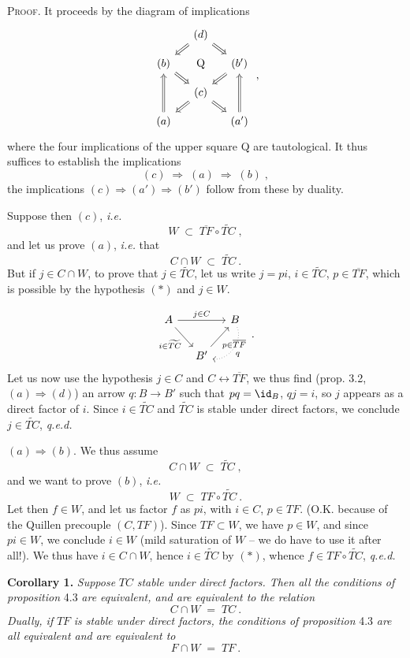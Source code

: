 \textsc{Proof}. It proceeds by the diagram of implications
\[
\begin{tikzcd}[column sep=small, row sep=small]
& (d) \arrow[dl, Rightarrow] \arrow[dr, Rightarrow] & \\
(b) \arrow[dr, Rightarrow] & \mathrm{Q} & (b') \arrow[dl, Rightarrow] \\
& (c) \arrow[dl, Rightarrow] \arrow[dr, Rightarrow] & \\
(a) \arrow[uu, Rightarrow] & & (a') \arrow[uu, Rightarrow]
\end{tikzcd}
\;,
\]
where the four implications of the upper square Q are tautological. It thus suffices to establish the implications
\[
(c) \;\Longrightarrow\; (a) \;\Longrightarrow\; (b)\;,
\]
the implications $(c)\Longrightarrow(a')\Longrightarrow(b')$ follow from these by duality.

Suppose then $(c)$, \textit{i.e.}
\[
W \;\subset\; \overline{TF}\circ\widetilde{TC}\;,
\tag*{$(*)$}
\]
and let us prove $(a)$, \textit{i.e.} that
\[
C\cap W \;\subset\; \widetilde{TC}\ .
\]
But if $j\in C\cap W$, to prove that $j\in\widetilde{TC}$, let us write $j=pi$, $i\in\widetilde{TC}$, $p\in\overline{TF}$, which is possible by the hypothesis $(*)$ and $j\in W$.

\[
\begin{tikzcd}[column sep=small]
A \arrow[rr, "j\in C"] \arrow[dr, "i\in\widetilde{TC}"'] & & B \arrow[dl, dotted, bend left=60, "q"] \\
& B' \arrow[ur, "p\in\overline{TF}"'] &
\end{tikzcd}
\;.
\]
Let us now use the hypothesis $j\in C$ and $C\longleftrightarrow\overline{TF}$, we thus find (prop. 3.2, $(a)\Longrightarrow(d)$) an arrow $q:B\longrightarrow B'$ such that $pq=\id_B$, $qj=i$, so $j$ appears as a direct factor of $i$. Since $i\in\widetilde{TC}$ and $\widetilde{TC}$ is stable under direct factors, we conclude $j\in\widetilde{TC}$, \quad \textit{q.e.d.}

$(a)\Longrightarrow(b)$. We thus assume
\[
C\cap W \;\subset\; \widetilde{TC}\;,
\tag*{$(*)$}
\]
and we want to prove $(b)$, \textit{i.e.}
\[
W \;\subset\; TF\circ\widetilde{TC}\ .
\]
Let then $f\in W$, and let us factor $f$ as $pi$, with $i\in C$, $p\in TF$. (O.K. because of the Quillen precouple $(C,TF)$). Since $TF\subset W$, we have $p\in W$, and since $pi\in W$, we conclude $i\in W$ (mild saturation of $W$ -- we do have to use it after all!). We thus have $i\in C{\cap}W$, hence $i\in\widetilde{TC}$ by $(*)$, whence $f\in TF\circ\widetilde{TC}$, \quad \textit{q.e.d.}

\textbf{Corollary 1.} \textit{Suppose} $TC$ \textit{stable under direct factors. Then all the conditions of proposition} 4.3 \textit{are equivalent, and are equivalent to the relation}
\[
C\cap W \;=\; TC\ .
\tag*{(4.3.4)}
\]
\textit{Dually, if} $TF$ \textit{is stable under direct factors, the conditions of proposition} 4.3 \textit{are all equivalent and are equivalent to}
\[
F\cap W \;=\; TF\ .
\tag*{(4.3.4$'$)}
\]